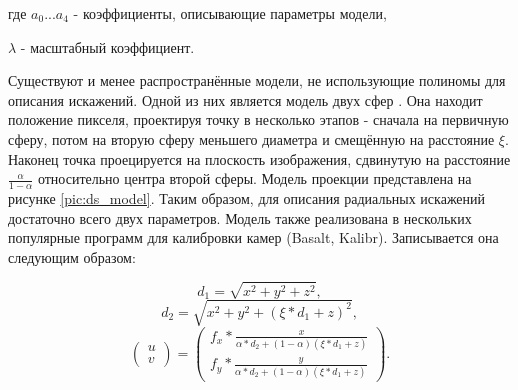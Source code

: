 где $a_0 ... a_4$ - коэффициенты, описывающие параметры модели,

\qquad $\lambda$ - масштабный коэффициент.

Существуют и менее распространённые модели, не использующие полиномы для описания искажений. Одной из них является
модель двух сфер \cite{double_sphere}. 
Она находит положение пикселя, проектируя точку в несколько этапов - сначала на первичную сферу, потом на вторую 
сферу меньшего диаметра и смещённую на расстояние $\xi$. Наконец точка проецируется на  плоскость изображения,
 сдвинутую на расстояние $\frac{\alpha}{1-\alpha}$ относительно центра второй сферы. Модель проекции представлена 
на рисунке \ref{pic:ds_model}. Таким образом, для описания радиальных искажений достаточно всего двух параметров.
 Модель также реализована в нескольких популярные программ для калибровки камер (Basalt, Kalibr). 
 Записывается она следующим образом:
\begin{eqseries}
    \begin{equation}	
        d_1 = \sqrt{x^2+y^2+z^2}, 
    \end{equation}
    \begin{equation}	
        d_2 = \sqrt{x^2+y^2+(\xi*d_1+z)^2 }, 
    \end{equation}
    \begin{equation}	
        \begin{pmatrix}u\\v\end{pmatrix} = \begin{pmatrix}f_x * \frac{x}{\alpha*d_2+(1-\alpha)(\xi*d_1+z)} \\
                                                    f_y * \frac{y}{\alpha*d_2+(1-\alpha)(\xi*d_1+z)} \end{pmatrix}.
        \label{eqn:ds}
    \end{equation}
\end{eqseries}

